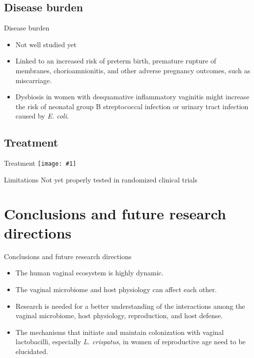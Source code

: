 \documentclass{beamer}
\newcommand*{\solo}[1]{\centering\texttt{[image: \#1]}}
\begin{document}

\subsection{Disease burden}
\begin{frame}{Disease burden}
    \begin{itemize}
        \item Not well studied yet
        \item Linked to an increased risk of preterm birth, premature rupture
              of membranes, chorioamnionitis, and other adverse pregnancy
              outcomes, such as miscarriage.
        \item Dysbiosis in women with desquamative inflammatory vaginitis might
              increase the risk of neonatal group B streptococcal infection or
              urinary tract infection caused by \textit{E. coli}.
    \end{itemize}
\end{frame}

\subsection{Treatment}
\begin{frame}{Treatment}
    \solo{T3.eps}
\end{frame}

\begin{frame}{Limitations}
    Not yet properly tested in randomized clinical trials
\end{frame}

\section{Conclusions and future research directions}
\begin{frame}{Conclusions and future research directions}
    \begin{itemize}
        \item The human vaginal ecosystem is highly dynamic.
        \item The vaginal microbiome and host physiology can affect each other.
        \item Research is needed for a better understanding of the interactions
              among the vaginal microbiome, host physiology, reproduction, and
              host defense.
        \item The mechanisms that initiate and maintain colonization with
              vaginal lactobacilli, especially \textit{L. crispatus}, in women
              of reproductive age need to be elucidated.
    \end{itemize}
\end{frame}
\end{document}
